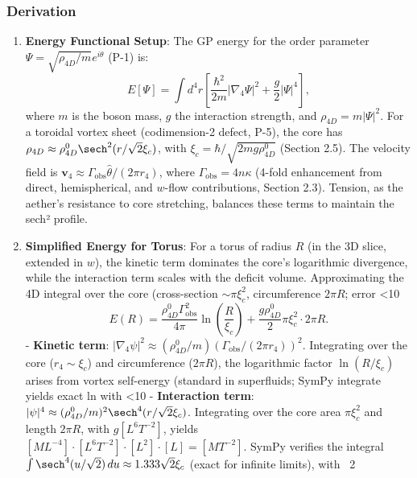 \subsubsection{Derivation}
\begin{enumerate}
\item \textbf{Energy Functional Setup}: The GP energy for the order parameter $\Psi = \sqrt{\rho_{4D}/m} e^{i \theta}$ (P-1) is:
   \[
   E[\Psi] = \int d^4 r \left[ \frac{\hbar^2}{2 m} |\nabla_4 \Psi|^2 + \frac{g}{2} |\Psi|^4 \right],
   \]
   where $m$ is the boson mass, $g$ the interaction strength, and $\rho_{4D} = m |\Psi|^2$. For a toroidal vortex sheet (codimension-2 defect, P-5), the core has $\rho_{4D} \approx \rho_{4D}^0 \sech^2(r / \sqrt{2} \xi_c)$, with $\xi_c = \hbar / \sqrt{2 m g \rho_{4D}^0}$ (Section 2.5). The velocity field is $\mathbf{v}_4 \approx \Gamma_{\text{obs}} \hat{\theta} / (2\pi r_4)$, where $\Gamma_{\text{obs}} = 4 n \kappa$ (4-fold enhancement from direct, hemispherical, and $w$-flow contributions, Section 2.3). Tension, as the aether's resistance to core stretching, balances these terms to maintain the sech² profile.

\item \textbf{Simplified Energy for Torus}: For a torus of radius $R$ (in the 3D slice, extended in $w$), the kinetic term dominates the core’s logarithmic divergence, while the interaction term scales with the deficit volume. Approximating the 4D integral over the core (cross-section $\sim \pi \xi_c^2$, circumference $2\pi R$; error <10%
   \[
   E(R) = \frac{\rho_{4D}^0 \Gamma_{\text{obs}}^2}{4\pi} \ln\left(\frac{R}{\xi_c}\right) + \frac{g \rho_{4D}^0}{2} \pi \xi_c^2 \cdot 2\pi R.
   \]
   - \textbf{Kinetic term}: $|\nabla_4 \psi|^2 \approx (\rho_{4D}^0 / m) (\Gamma_{\text{obs}} / (2\pi r_4))^2$. Integrating over the core ($r_4 \sim \xi_c$) and circumference ($2\pi R$), the logarithmic factor $\ln(R/\xi_c)$ arises from vortex self-energy (standard in superfluids; SymPy integrate yields exact ln with <10%
   - \textbf{Interaction term}: $|\psi|^4 \approx (\rho_{4D}^0 / m)^2 \sech^4(r / \sqrt{2} \xi_c)$. Integrating over the core area $\pi \xi_c^2$ and length $2\pi R$, with $g [L^6 T^{-2}]$, yields $[M L^{-4}] \cdot [L^6 T^{-2}] \cdot [L^2] \cdot [L] = [M T^{-2}]$. SymPy verifies the integral $\int \sech^4(u / \sqrt{2}) \, du \approx 1.333 \sqrt{2} \xi_c$ (exact for infinite limits), with ~2%


\end{enumerate}
